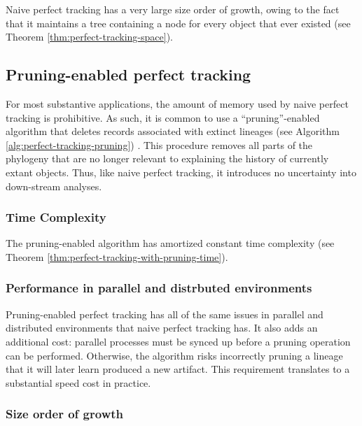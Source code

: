 Naive perfect tracking has a very large size order of growth, owing to the fact that it maintains a tree containing a node for every object that ever existed (see Theorem \ref{thm:perfect-tracking-space}).



\subsection{Pruning-enabled perfect tracking}
\label{sec:naive-perfect-tracking-with-pruning}

For most substantive applications, the amount of memory used by naive perfect tracking is prohibitive.
As such, it is common to use a ``pruning''-enabled algorithm that deletes records associated with extinct lineages (see Algorithm \ref{alg:perfect-tracking-pruning}) \citep{dolson2023phylotrackpy}.
This procedure removes all parts of the phylogeny that are no longer relevant to explaining the history of currently extant objects.
Thus, like naive perfect tracking, it introduces no uncertainty into down-stream analyses.



\subsubsection{Time Complexity}

The pruning-enabled algorithm has amortized constant time complexity (see Theorem \ref{thm:perfect-tracking-with-pruning-time}).



\subsubsection{Performance in parallel and distrbuted environments}
\label{sec:perfect-tracking-pruning-distrbuted}
Pruning-enabled perfect tracking has all of the same issues in parallel and distributed environments that naive perfect tracking has.
It also adds an additional cost: parallel processes must be synced up before a pruning operation can be performed.
Otherwise, the algorithm risks incorrectly pruning a lineage that it will later learn produced a new artifact.
This requirement translates to a substantial speed cost in practice. 


\subsubsection{Size order of growth}
\label{sec:perfect-tracking-pruning-space}

